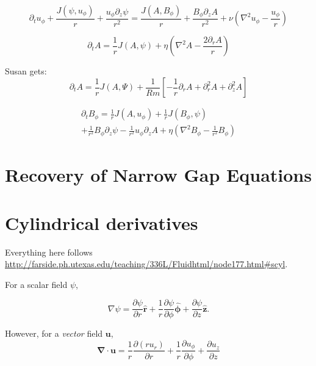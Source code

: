 \documentclass{paper}
\newcommand{\beq}{\begin{equation}}
\newcommand{\eeq}{\end{equation}}
\newcommand{\uphi}{\ensuremath{u_\phi}}
\newcommand{\rhat}{\ensuremath{\mathbf{\hat{r}}}}
\newcommand{\phihat}{\ensuremath{\mathbf{\hat{\phi}}}}
\newcommand{\zhat}{\ensuremath{\mathbf{\hat{z}}}}
\begin{document}
\begin{equation}
  \label{eq:uy}
\partial_t \uphi + \frac{J(\psi, \uphi)}{r} + \frac{\uphi \partial_z \psi}{r^2} = \frac{J(A, B_\phi)}{r} + \frac{B_\phi \partial_z A}{r^2} + \nu \left( \nabla^2 \uphi - \frac{\uphi}{r}\right)
\end{equation}

\begin{equation}
  \label{eq:A}
\partial_t A = \frac{1}{r} J(A, \psi) + \eta \left( \nabla^2 A - \frac{2 \partial_r A}{r} \right)
\end{equation}

Susan gets:
\beq
\partial_t A = \frac{1}{r} J(A, \Psi) + \frac{1}{Rm} \left[ -\frac{1}{r} \partial_r A + \partial_r^2 A + \partial_z^2 A\right]
\eeq

\begin{multline}
  \label{eq:By} %
\partial_t B_\phi = \frac{1}{r} J(A, \uphi) + \frac{1}{r} J(B_\phi, \psi)\\
+ \frac{1}{r^2} B_\phi \partial_z \psi - \frac{1}{r^2} \uphi \partial_z A + \eta \left(\nabla^2 B_\phi - \frac{1}{r^2} B_\phi \right)
\end{multline}

\section{Recovery of Narrow Gap Equations}
\label{sec:narrow_gap_recovery}

\appendix

\section{Cylindrical derivatives}
\label{sec:cylindrical_deriv}

Everything here follows \url{http://farside.ph.utexas.edu/teaching/336L/Fluidhtml/node177.html#scyl}.

For a scalar field $\psi$, 

\begin{equation}
  \label{eq:del_scalar}
  \nabla \psi = \frac{\partial \psi}{\partial r} \rhat + \frac{1}{r} \frac{\partial \psi}{\partial \phi} \phihat + \frac{\partial \psi}{\partial z} \zhat.
\end{equation}

However, for a \emph{vector} field $\mathbf{u}$,
\begin{equation}
  \label{eq:div}
  \mathbf{\nabla \cdot u} = \frac{1}{r} \frac{\partial (r u_r)}{\partial r} + \frac{1}{r} \frac{\partial \uphi}{\partial \phi}  + \frac{\partial u_z}{\partial z}
\end{equation}
\end{document}
